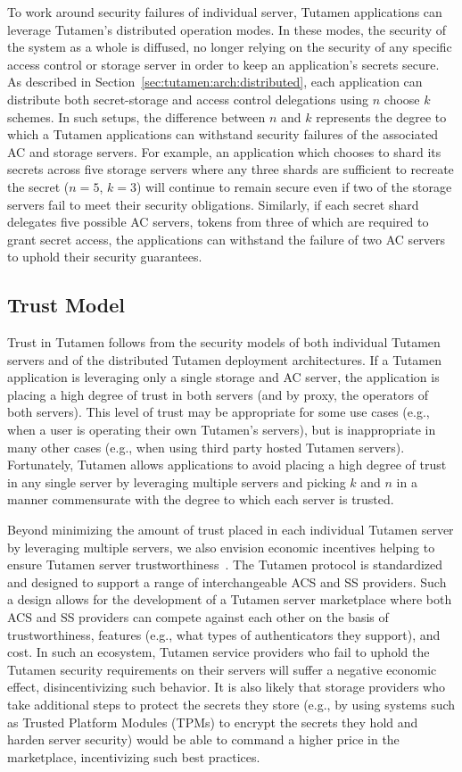 To work around security failures of individual server, Tutamen
applications can leverage Tutamen's distributed operation modes. In
these modes, the security of the system as a whole is diffused, no
longer relying on the security of any specific access control or
storage server in order to keep an application's secrets secure. As
described in Section~\ref{sec:tutamen:arch:distributed}, each
application can distribute both secret-storage and access control
delegations using $n$ choose $k$ schemes. In such setups, the
difference between $n$ and $k$ represents the degree to which a
Tutamen applications can withstand security failures of the associated
AC and storage servers. For example, an application which chooses to
shard its secrets across five storage servers where any three shards
are sufficient to recreate the secret ($n=5$, $k=3$) will continue to
remain secure even if two of the storage servers fail to meet their
security obligations. Similarly, if each secret shard delegates five
possible AC servers, tokens from three of which are required to grant
secret access, the applications can withstand the failure of two AC
servers to uphold their security guarantees.

\subsection{Trust Model}

Trust in Tutamen follows from the security models of both individual
Tutamen servers and of the distributed Tutamen deployment
architectures. If a Tutamen application is leveraging only a single
storage and AC server, the application is placing a high degree of
trust in both servers (and by proxy, the operators of both
servers). This level of trust may be appropriate for some use cases
(e.g., when a user is operating their own Tutamen's servers), but is
inappropriate in many other cases (e.g., when using third party hosted
Tutamen servers). Fortunately, Tutamen allows applications to avoid
placing a high degree of trust in any single server by leveraging
multiple servers and picking $k$ and $n$ in a manner commensurate with
the degree to which each server is trusted.

Beyond minimizing the amount of trust placed in each individual
Tutamen server by leveraging multiple servers, we also envision
economic incentives helping to ensure Tutamen server
trustworthiness~\cite{anderson2001}. The Tutamen protocol is
standardized and designed to support a range of interchangeable ACS
and SS providers. Such a design allows for the development of a
Tutamen server marketplace where both ACS and SS providers can compete
against each other on the basis of trustworthiness, features (e.g.,
what types of authenticators they support), and cost. In such an
ecosystem, Tutamen service providers who fail to uphold the Tutamen
security requirements on their servers will suffer a negative economic
effect, disincentivizing such behavior. It is also likely that storage
providers who take additional steps to protect the secrets they store
(e.g., by using systems such as Trusted Platform Modules (TPMs) to
encrypt the secrets they hold and harden server security) would be
able to command a higher price in the marketplace, incentivizing such
best practices.

